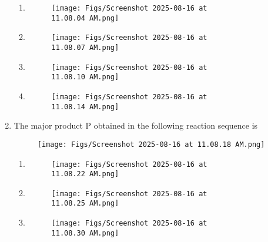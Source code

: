 \documentclass[12pt]{article}
\begin{document}
\begin{enumerate}
\begin{enumerate} 
    \item \begin{figure}[H]
\centering
\texttt{[image: Figs/Screenshot 2025-08-16 at 11.08.04 AM.png]}
\caption{}
\end{figure}

\item  \begin{figure}[H]
\centering
\texttt{[image: Figs/Screenshot 2025-08-16 at 11.08.07 AM.png]}
\caption{}
\end{figure}


\item  \begin{figure}[H]
\centering
\texttt{[image: Figs/Screenshot 2025-08-16 at 11.08.10 AM.png]}
\caption{}
\end{figure}

\item  
\begin{figure}[H]
\centering
\texttt{[image: Figs/Screenshot 2025-08-16 at 11.08.14 AM.png]}
\caption{}
\end{figure}

\end{enumerate}


\item The major product P obtained in the following reaction sequence is
\begin{figure}[H]
\centering
\texttt{[image: Figs/Screenshot 2025-08-16 at 11.08.18 AM.png]}
\caption{}
\end{figure}
  

\begin{enumerate} 
    \item \begin{figure}[H]
\centering
\texttt{[image: Figs/Screenshot 2025-08-16 at 11.08.22 AM.png]}
\caption{}
\end{figure}

\item  \begin{figure}[H]
\centering
\texttt{[image: Figs/Screenshot 2025-08-16 at 11.08.25 AM.png]}
\caption{}
\end{figure}


\item  \begin{figure}[H]
\centering
\texttt{[image: Figs/Screenshot 2025-08-16 at 11.08.30 AM.png]}
\caption{}
\end{figure}


\end{enumerate}
\end{enumerate}
\end{document}
